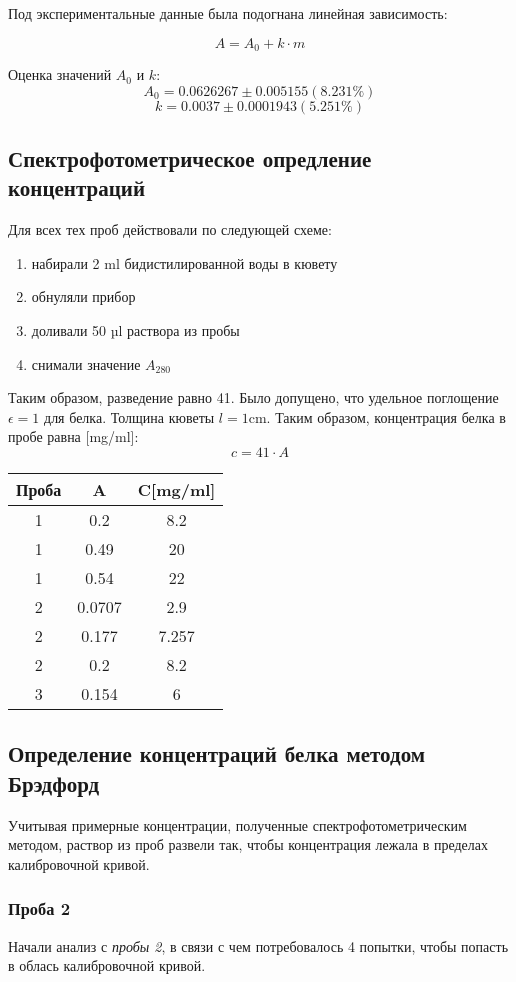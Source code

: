 Под экспериментальные данные была подогнана линейная зависимость:

$$ A = A_0 + k \cdot m $$

Оценка значений $A_0$ и $k$:
$$ A_0 = 0.0626267 \pm 0.005155 (8.231\%) $$
$$ k = 0.0037 \pm 0.0001943 (5.251\%) $$



\subsection{Спектрофотометрическое опредление концентраций}
Для всех тех проб действовали по следующей схеме:
\begin{enumerate}
\item набирали 2 ml бидистилированной воды в кювету
\item обнуляли прибор
\item доливали 50 µl раствора из пробы
\item снимали значение $A_{280}$
\end{enumerate}
Таким образом, разведение равно 41.
Было допущено, что удельное поглощение $\epsilon = 1$ для белка.
Толщина кюветы $l = 1 \text{cm}$.
Таким образом, концентрация белка в пробе равна [mg/ml]:
$$ c=41 \cdot A $$

\begin{tabular}{|c|c|c|}
\hline
Проба & A & C[mg/ml] \\
\hline
1 & 0.2 & 8.2 \\
1 & 0.49 & 20 \\
1 & 0.54 & 22 \\
\hline
2 & 0.0707 & 2.9 \\
2 & 0.177 & 7.257 \\
2 & 0.2 & 8.2 \\
\hline
3 & 0.154 & 6 \\
\hline
\end{tabular}

\subsection{Определение концентраций белка методом Брэдфорд}

Учитывая примерные концентрации, полученные спектрофотометрическим методом,
раствор из проб развели так, чтобы концентрация лежала в пределах
калибровочной кривой.

\subsubsection{Проба 2}
Начали анализ с \emph{пробы 2}, в связи с чем потребовалось 4 попытки,
чтобы попасть в облась калибровочной кривой.

